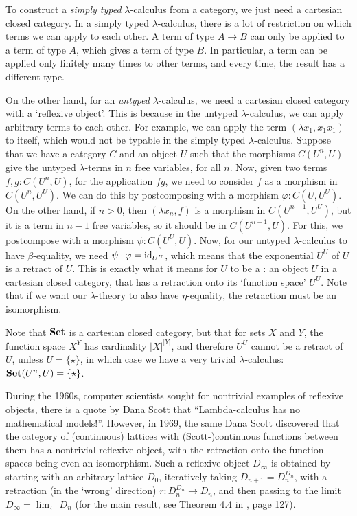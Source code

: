 \begin{remark}
  To construct a \textit{simply typed} $ \lambda $-calculus from a category, we just need a cartesian closed category. In a simply typed $ \lambda $-calculus, there is a lot of restriction on which terms we can apply to each other. A term of type $ A \to B $ can only be applied to a term of type $ A $, which gives a term of type $ B $. In particular, a term can be applied only finitely many times to other terms, and every time, the result has a different type.

  On the other hand, for an \textit{untyped} $ \lambda $-calculus, we need a cartesian closed category with a `reflexive object'. This is because in the untyped $ \lambda $-calculus, we can apply arbitrary terms to each other. For example, we can apply the term $ (\lambda x_1, x_1 x_1) $ to itself, which would not be typable in the simply typed $ \lambda $-calculus. Suppose that we have a category $ C $ and an object $ U $ such that the morphisms $ C(U^n, U) $ give the untyped $ \lambda $-terms in $ n $ free variables, for all $ n $. Now, given two terms $ f, g : C(U^n, U) $, for the application $ f g $, we need to consider $ f $ as a morphism in $ C(U^n, U^U) $. We can do this by postcomposing with a morphism $ \varphi: C(U, U^U) $. On the other hand, if $ n > 0 $, then $ (\lambda x_n, f) $ is a morphism in $ C(U^{n - 1}, U^U) $, but it is a term in $ n - 1 $ free variables, so it should be in $ C(U^{n - 1}, U) $. For this, we postcompose with a morphism $ \psi: C(U^U, U) $. Now, for our untyped $ \lambda $-calculus to have $ \beta $-equality, we need $ \psi \cdot \varphi = \text{id}_{U^U} $, which means that the exponential $ U^U $ of $ U $ is a retract of $ U $. This is exactly what it means for $ U $ to be a : an object $ U $ in a cartesian closed category, that has a retraction onto its `function space' $ U^U $. Note that if we want our $ \lambda $-theory to also have $ \eta $-equality, the retraction must be an isomorphism.

  Note that $ \mathbf{Set} $ is a cartesian closed category, but that for sets $ X $ and $ Y $, the function space $ X^Y $ has cardinality $ \vert X \vert^{\vert Y \vert} $, and therefore $ U^U $ cannot be a retract of $ U $, unless $ U = \{ \star \} $, in which case we have a very trivial $ \lambda $-calculus: $ \mathbf{Set}(U^n, U) = \{ \star \} $.

  During the 1960s, computer scientists sought for nontrivial examples of reflexive objects, there is a quote by Dana Scott that ``Lambda-calculus has no mathematical models!''\autocite{strachey}. However, in 1969, the same Dana Scott discovered that the category of (continuous) lattices with (Scott-)continuous functions between them has a nontrivial reflexive object, with the retraction onto the function spaces being even an isomorphism. Such a reflexive object $ D_\infty $ is obtained by starting with an arbitrary lattice $ D_0 $, iteratively taking $ D_{n + 1} = D_n^{D_n} $, with a retraction (in the `wrong' direction) $ r: D_n^{D_n} \to D_n $, and then passing to the limit $ D_\infty = \lim_{\leftarrow} D_n $ (for the main result, see Theorem 4.4 in \autocite{scott-continuous}, page 127).
\end{remark}

